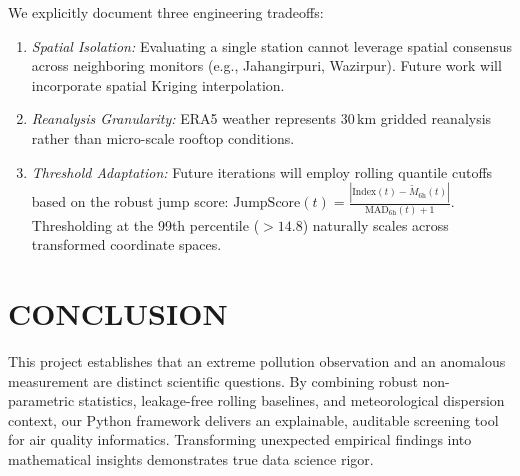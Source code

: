 \documentclass[twoside]{article}
\begin{document}
We explicitly document three engineering tradeoffs:
\begin{enumerate}
  \setlength{\itemsep}{1pt}
  \item \emph{Spatial Isolation:} Evaluating a single station cannot leverage spatial consensus across neighboring monitors (e.g., Jahangirpuri, Wazirpur). Future work will incorporate spatial Kriging interpolation.
  \item \emph{Reanalysis Granularity:} ERA5 weather represents $30\,\text{km}$ gridded reanalysis rather than micro-scale rooftop conditions.
  \item \emph{Threshold Adaptation:} Future iterations will employ rolling quantile cutoffs based on the robust jump score: $\text{JumpScore}(t) = \frac{|\mathrm{Index}(t) - \tilde{M}_{6\mathrm{h}}(t)|}{\mathrm{MAD}_{6\mathrm{h}}(t) + 1}$. Thresholding at the 99th percentile ($>14.8$) naturally scales across transformed coordinate spaces.
\end{enumerate}

\section{CONCLUSION}

This project establishes that an extreme pollution observation and an anomalous measurement are distinct scientific questions. By combining robust non-parametric statistics, leakage-free rolling baselines, and meteorological dispersion context, our Python framework delivers an explainable, auditable screening tool for air quality informatics. Transforming unexpected empirical findings into mathematical insights demonstrates true data science rigor.
\end{document}
